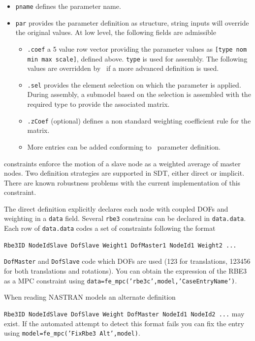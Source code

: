 \begin{itemize}
\begin{itemize}
\end{itemize}
\item {\tt pname} defines the parameter name.
\item {\tt par} provides the parameter definition as structure, string inputs will override the original values. At low level, the following fields are admissible
\begin{itemize}
\item {\tt .coef} a 5 value row vector providing the parameter values as {\tt [type nom min max scale]}, defined above. {\tt type} is used for assembly. The following values are overridden by \ferange\ if a more advanced definition is used.
\item {\tt .sel} provides the element selection on which the parameter is applied. During assembly, a submodel based on the selection is assembled with the required type to provide the associated matrix.
\item {\tt .zCoef} (optional) defines a non standard weighting coefficient rule for the matrix.
\item More entries can be added conforming to \ferange\ parameter definition.
\end{itemize}
\end{itemize}


 constraints enforce the motion of a slave node as a weighted average of master nodes. Two definition strategies are supported in SDT, either direct or implicit. There are known robustness problems with the current implementation of this constraint.

The direct definition explicitly declares each node with coupled DOFs and weighting in a {\tt data} field. Several {\tt rbe3} constrains can be declared in {\tt data.data}. Each row of {\tt data.data} codes a set of constraints following the format

{\tt Rbe3ID NodeIdSlave DofSlave Weight1 DofMaster1 NodeId1 Weight2 ...}

{\tt DofMaster} and {\tt DofSlave} code which DOFs are used (123 for translations, 123456 for both translations and rotations). You can obtain the expression of the RBE3 as a MPC constraint using {\tt data=fe\_mpc('rbe3c',model,'CaseEntryName')}. 

When reading NASTRAN models an alternate definition 

{\tt Rbe3ID NodeIdSlave DofSlave Weight DofMaster NodeId1 NodeId2 ...}
%
may exist. If the automated attempt to detect this format fails you can fix the entry using {\tt model=fe\_mpc('FixRbe3 Alt',model)}. 

